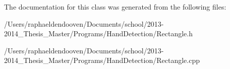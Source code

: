The documentation for this class was generated from the following files\-:\begin{DoxyCompactItemize}
\item 
/\-Users/raphaeldendooven/\-Documents/school/2013-\/2014\-\_\-\-Thesis\-\_\-\-Master/\-Programs/\-Hand\-Detection/Rectangle.\-h\item 
/\-Users/raphaeldendooven/\-Documents/school/2013-\/2014\-\_\-\-Thesis\-\_\-\-Master/\-Programs/\-Hand\-Detection/Rectangle.\-cpp\end{DoxyCompactItemize}
